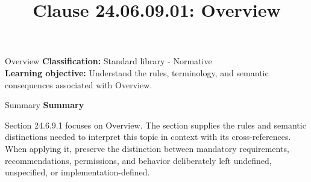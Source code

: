 \documentclass[10pt,letterpaper]{article}
\title{Clause 24.06.09.01: Overview}
\author{}
\date{}
\begin{document}
\maketitle
\begin{CornellOverviewBox}{Overview}
\textbf{Classification:} Standard library - Normative\\[2pt]
\textbf{Learning objective:} Understand the rules, terminology, and semantic consequences associated with Overview.
\end{CornellOverviewBox}\begin{CornellSummaryBox}{Summary}
{\sffamily\bfseries\color{Accent} Summary}\par\vspace{3pt}Section 24.6.9.1 focuses on Overview. The section supplies the rules and semantic distinctions needed to interpret this topic in context with its cross-references. When applying it, preserve the distinction between mandatory requirements, recommendations, permissions, and behavior deliberately left undefined, unspecified, or implementation-defined.
\end{CornellSummaryBox}
\end{document}
